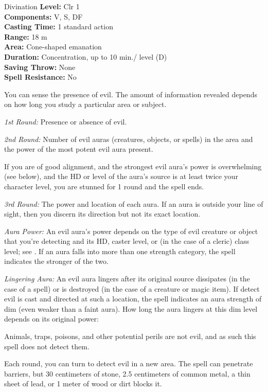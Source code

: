 {Divination}
{
	\textbf{Level:}
	Clr 1\\
	\textbf{Components:}
	V, S, DF\\
	\textbf{Casting Time:}
	1 standard action\\
	\textbf{Range:}
	18 m\\
	\textbf{Area:}
	Cone-shaped emanation\\
	\textbf{Duration:}
	Concentration, up to 10 min./ level (D)\\
	\textbf{Saving Throw:}
	None\\
	\textbf{Spell Resistance:}
	No\\
}
{
	You can sense the presence of evil. The amount of information revealed depends on how long you study a particular area or subject.

	\textit{1st Round:}
	Presence or absence of evil.

	\textit{2nd Round:}
	Number of evil auras (creatures, objects, or spells) in the area and the power of the most potent evil aura present.

	If you are of good alignment, and the strongest evil aura's power is overwhelming (see below), and the HD or level of the aura's source is at least twice your character level, you are stunned for 1 round and the spell ends.

	\textit{3rd Round:}
	The power and location of each aura. If an aura is outside your line of sight, then you discern its direction but not its exact location.

	\textit{Aura Power:}
	An evil aura's power depends on the type of evil creature or object that you're detecting and its HD, caster level, or (in the case of a cleric) class level; see . If an aura falls into more than one strength category, the spell indicates the stronger of the two.

	\textit{Lingering Aura:}
	An evil aura lingers after its original source dissipates (in the case of a spell) or is destroyed (in the case of a creature or magic item). If detect evil is cast and directed at such a location, the spell indicates an aura strength of dim (even weaker than a faint aura). How long the aura lingers at this dim level depends on its original power:


	Animals, traps, poisons, and other potential perils are not evil, and as such this spell does not detect them.

	Each round, you can turn to detect evil in a new area. The spell can penetrate barriers, but 30 centimeters of stone, 2.5 centimeters of common metal, a thin sheet of lead, or 1 meter of wood or dirt blocks it.

}
